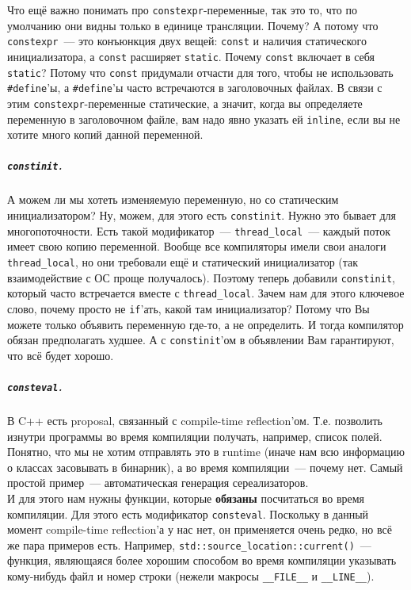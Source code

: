 \documentclass{article}
\begin{document}
    Что ещё важно понимать про \texttt{constexpr}-переменные, так это то, что по умолчанию они видны только в единице трансляции. Почему? А потому что \texttt{constexpr}~--- это конъюнкция двух вещей: \texttt{const} и наличия статического инициализатора, а \texttt{const} расширяет \texttt{static}. Почему \texttt{const} включает в себя \texttt{static}? Потому что \texttt{const} придумали отчасти для того, чтобы не использовать \texttt{#define}'ы, а \texttt{#define}'ы часто встречаются в заголовочных файлах. В связи с этим \texttt{constexpr}-переменные статические, а значит, когда вы определяете переменную в заголовочном файле, вам надо явно указать ей \texttt{inline}, если вы не хотите много копий данной переменной.
    \subparagraph{\texttt{constinit}.}
    А можем ли мы хотеть изменяемую переменную, но со статическим инициализатором? Ну, можем, для этого есть \texttt{constinit}. Нужно это бывает для многопоточности. Есть такой модификатор~--- \texttt{thread_local}~--- каждый поток имеет свою копию переменной. Вообще все компиляторы имели свои аналоги \texttt{thread_local}, но они требовали ещё и статический инициализатор (так взаимодействие с ОС проще получалось). Поэтому теперь добавили \texttt{constinit}, который часто встречается вместе с \texttt{thread_local}. Зачем нам для этого ключевое слово, почему просто не \texttt{if}'ать, какой там инициализатор? Потому что Вы можете только объявить переменную где-то, а не определить. И тогда компилятор обязан предполагать худшее. А с \texttt{constinit}'ом в объявлении Вам гарантируют, что всё будет хорошо.
    \subparagraph{\texttt{consteval}.}
    В C++ есть proposal, связанный с compile-time reflection'ом. Т.е. позволить изнутри программы во время компиляции получать, например, список полей. Понятно, что мы не хотим отправлять это в runtime (иначе нам всю информацию о классах засовывать в бинарник), а во время компиляции~--- почему нет. Самый простой пример~--- автоматическая генерация сереализаторов.\\
    И для этого нам нужны функции, которые \textbf{обязаны} посчитаться во время компиляции. Для этого есть модификатор \texttt{consteval}. Поскольку в данный момент compile-time reflection'а у нас нет, он применяется очень редко, но всё же пара примеров есть. Например, \texttt{std::source_location::current()}~--- функция, являющаяся более хорошим способом во время компиляции указывать кому-нибудь файл и номер строки (нежели макросы \texttt{__FILE__} и \texttt{__LINE__}).
\end{document}
